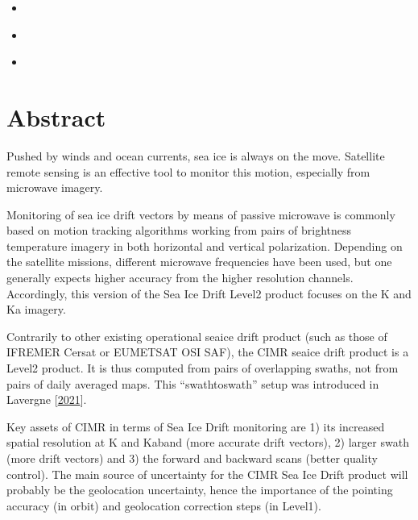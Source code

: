 \documentclass[letterpaper,10pt,english]{jupyterBook}
\begin{document}
\begin{itemize}
\item {} 
\sphinxAtStartPar
{\hyperref[\detokenize{CIMR_L2_Sea_Ice_Drift_performanceAssessment::doc}]{}}

\item {} 
\sphinxAtStartPar
{\hyperref[\detokenize{roadmap_for_future_atbd_developments::doc}]{}}

\item {} 
\sphinxAtStartPar
{\hyperref[\detokenize{references::doc}]{}}

\end{itemize}

\sphinxstepscope


\chapter{Abstract}
\label{\detokenize{abstract:abstract}}\label{\detokenize{abstract::doc}}
\sphinxAtStartPar
Pushed by winds and ocean currents, sea ice is always on the move. Satellite remote sensing is an effective tool to monitor this motion, especially from microwave imagery.

\sphinxAtStartPar
Monitoring of sea ice drift vectors by means of passive microwave is commonly based on motion tracking algorithms working from pairs of brightness temperature imagery in both horizontal and vertical polarization.
Depending on the satellite missions, different microwave frequencies have been used, but one generally expects higher accuracy from the higher resolution channels.
Accordingly, this version of the Sea Ice Drift Level\sphinxhyphen{}2 product focuses on the K and Ka imagery.

\sphinxAtStartPar
Contrarily to other existing operational sea\sphinxhyphen{}ice drift product (such as those of IFREMER Cersat or EUMETSAT OSI SAF), the CIMR sea\sphinxhyphen{}ice drift product is a Level\sphinxhyphen{}2 product. It is thus computed from pairs of
overlapping swaths, not from pairs of daily averaged maps. This “swath\sphinxhyphen{}to\sphinxhyphen{}swath” setup was introduced in Lavergne  {[}\hyperlink{cite.references:id20}{2021}{]}.

\sphinxAtStartPar
Key assets of CIMR in terms of Sea Ice Drift monitoring are 1) its increased spatial resolution at K\sphinxhyphen{} and Ka\sphinxhyphen{}band (more accurate drift vectors), 2) larger swath (more drift vectors) and 3) the forward
and backward scans (better quality control). The main source of uncertainty for the CIMR Sea Ice Drift product will probably be the geolocation uncertainty, hence the importance of the pointing
accuracy (in orbit) and geolocation correction steps (in Level\sphinxhyphen{}1).
\end{document}
